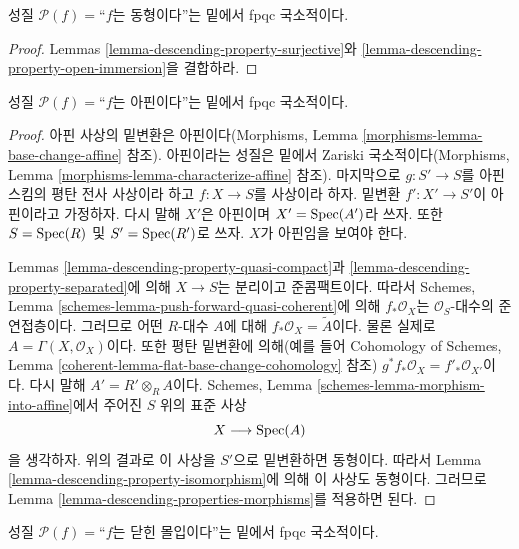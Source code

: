 \begin{lemma}
\label{lemma-descending-property-isomorphism}
성질 $\mathcal{P}(f) =$“$f$는 동형이다”는 밑에서 fpqc 국소적이다.
\end{lemma}

\begin{proof}
Lemmas \ref{lemma-descending-property-surjective}와
\ref{lemma-descending-property-open-immersion}을 결합하라.
\end{proof}

\begin{lemma}
\label{lemma-descending-property-affine}
성질 $\mathcal{P}(f) =$“$f$는 아핀이다”는 밑에서 fpqc 국소적이다.
\end{lemma}

\begin{proof}
아핀 사상의 밑변환은 아핀이다(Morphisms, Lemma
\ref{morphisms-lemma-base-change-affine} 참조). 아핀이라는 성질은
밑에서 Zariski 국소적이다(Morphisms, Lemma
\ref{morphisms-lemma-characterize-affine} 참조). 마지막으로
$g : S' \to S$를 아핀 스킴의 평탄 전사 사상이라 하고 $f : X \to S$를
사상이라 하자. 밑변환 $f' : X' \to S'$이 아핀이라고 가정하자. 다시
말해 $X'$은 아핀이며 $X' = \mathop{\mathrm{Spec}}(A')$라 쓰자. 또한
$S = \mathop{\mathrm{Spec}}(R)$ 및 $S' = \mathop{\mathrm{Spec}}(R')$로 쓰자. $X$가 아핀임을 보여야 한다.

\medskip\noindent
Lemmas \ref{lemma-descending-property-quasi-compact}과
\ref{lemma-descending-property-separated}에 의해 $X \to S$는 분리이고
준콤팩트이다. 따라서 Schemes, Lemma
\ref{schemes-lemma-push-forward-quasi-coherent}에 의해
$f_*\mathcal{O}_X$는 $\mathcal{O}_S$-대수의 준연접층이다. 그러므로 어떤
$R$-대수 $A$에 대해 $f_*\mathcal{O}_X = \widetilde{A}$이다. 물론 실제로
$A = \Gamma(X, \mathcal{O}_X)$이다. 또한 평탄 밑변환에 의해(예를 들어
Cohomology of Schemes, Lemma
\ref{coherent-lemma-flat-base-change-cohomology} 참조)
$g^*f_*\mathcal{O}_X = f'_*\mathcal{O}_{X'}$이다. 다시 말해
$A' = R' \otimes_R A$이다. Schemes, Lemma
\ref{schemes-lemma-morphism-into-affine}에서 주어진 $S$ 위의 표준 사상
$$
X \longrightarrow \mathop{\mathrm{Spec}}(A)
$$
을 생각하자. 위의 결과로 이 사상을 $S'$으로 밑변환하면 동형이다. 따라서
Lemma \ref{lemma-descending-property-isomorphism}에 의해 이 사상도
동형이다. 그러므로 Lemma \ref{lemma-descending-properties-morphisms}를
적용하면 된다.
\end{proof}

\begin{lemma}
\label{lemma-descending-property-closed-immersion}
성질 $\mathcal{P}(f) =$“$f$는 닫힌 몰입이다”는 밑에서 fpqc 국소적이다.
\end{lemma}

